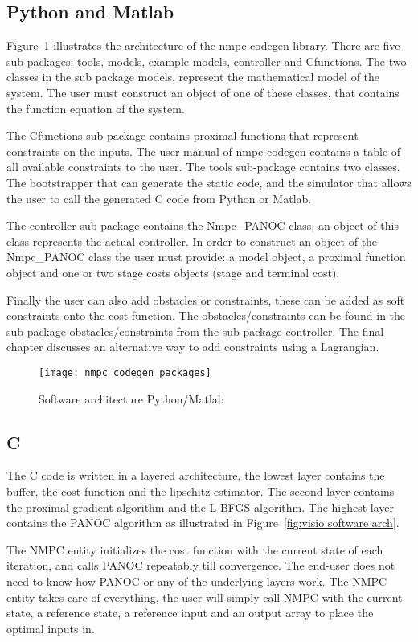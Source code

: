 \subsection{Python and Matlab}
Figure~\ref{fig:nmpc_codegen_packages} illustrates the architecture of the nmpc-codegen library. There are five sub-packages: tools, models, example models, controller and Cfunctions.  The two classes in the sub package models, represent the mathematical model of the system. The user must construct an object of one of these classes, that contains the function equation of the system.

The Cfunctions sub package contains proximal functions that represent constraints on the inputs. The user manual of nmpc-codegen contains a table of all available constraints to the user. The tools sub-package contains two classes. The bootstrapper that can generate the static code, and the simulator that allows the user to call the generated C code from Python or Matlab.

The controller sub package contains the Nmpc\_PANOC class, an object of this class represents the actual controller. In order to construct an object of the Nmpc\_PANOC class the user must provide: a model object, a proximal function object and one or two stage costs objects (stage and terminal cost).

Finally the user can also add obstacles or constraints, these can be added as soft constraints onto the cost function. The obstacles/constraints can be found in the sub package obstacles/constraints from the sub package controller. The final chapter discusses an alternative way to add constraints using a Lagrangian.
	\begin{figure}[H]
		\centering
		\texttt{[image: nmpc\_codegen\_packages]}
		\caption{Software architecture Python/Matlab}
		\label{fig:nmpc_codegen_packages}
	\end{figure}

\subsection{C}
The C code is written in a layered architecture, the lowest layer contains the buffer, the cost function and the lipschitz estimator. The second layer contains the proximal gradient algorithm and the L-BFGS algorithm. The highest layer contains the PANOC algorithm as illustrated in Figure~\ref{fig:visio software arch}.

The NMPC entity initializes the cost function with the current state of each iteration, and calls PANOC repeatably till convergence. The end-user does not need to know how PANOC or any of the underlying layers work. The NMPC entity takes care of everything, the user will simply call NMPC with the current state, a reference state, a reference input and an output array to place the optimal inputs in.

